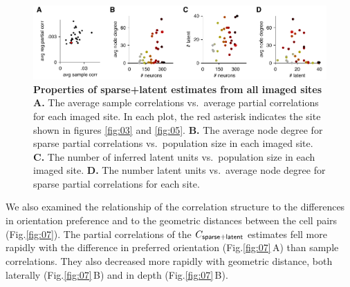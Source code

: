 \documentclass[10pt]{article}
\newcommand{\figref}[2]{Fig.\;\ref{fig:#1}\,#2}
\begin{document}
\begin{figure}[!ht]
    \begin{center}
        \includegraphics{./figures/Figure06.pdf}
    \end{center}
    \caption{{\bf Properties of sparse+latent estimates from all imaged sites}
\\
    {\bf A.} The average sample correlations vs.~average partial correlations for each imaged site. In each plot, the red asterisk indicates the site shown in figures \ref{fig:03} and \ref{fig:05}.
    {\bf B.} The average node degree for sparse partial correlations vs.~population size in each imaged site. 
    {\bf C.} The number of inferred latent units vs.~population size in each imaged site.
    {\bf D.} The number latent units vs.~average node degree for sparse partial correlations for each site.
}
\label{fig:06}
\end{figure}

We also examined the relationship of the correlation structure to the differences in orientation preference and to the geometric distances between the cell pairs (Fig.\;\ref{fig:07}).  The partial correlations of the $C_{\sf sparse+latent}$ estimates fell more rapidly with the difference in preferred orientation (\figref{07}{A}) than sample correlations. They also decreased more rapidly with geometric distance, both laterally  (\figref{07}{B}) and in depth (\figref{07}{B}). 
\end{document}
